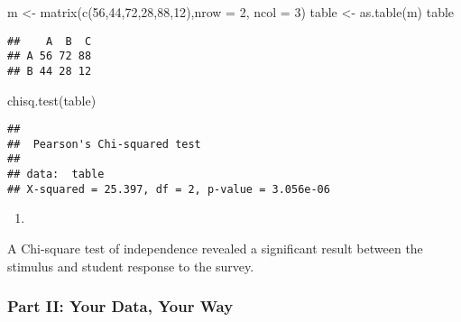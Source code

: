 \documentclass[
]{article}
\newenvironment{Shaded}{\begin{snugshade}}{\end{snugshade}}
\newcommand{\AttributeTok}[1]{\textcolor[rgb]{0.77,0.63,0.00}{#1}}
\newcommand{\DecValTok}[1]{\textcolor[rgb]{0.00,0.00,0.81}{#1}}
\newcommand{\FunctionTok}[1]{\textcolor[rgb]{0.00,0.00,0.00}{#1}}
\newcommand{\NormalTok}[1]{#1}
\newcommand{\OtherTok}[1]{\textcolor[rgb]{0.56,0.35,0.01}{#1}}
\providecommand{\tightlist}{%
  \setlength{\itemsep}{0pt}\setlength{\parskip}{0pt}}
\begin{document}
\begin{Shaded}
\begin{Highlighting}[]
\NormalTok{m }\OtherTok{\textless{}{-}} \FunctionTok{matrix}\NormalTok{(}\FunctionTok{c}\NormalTok{(}\DecValTok{56}\NormalTok{,}\DecValTok{44}\NormalTok{,}\DecValTok{72}\NormalTok{,}\DecValTok{28}\NormalTok{,}\DecValTok{88}\NormalTok{,}\DecValTok{12}\NormalTok{),}\AttributeTok{nrow =} \DecValTok{2}\NormalTok{, }\AttributeTok{ncol =} \DecValTok{3}\NormalTok{)}
\NormalTok{table }\OtherTok{\textless{}{-}} \FunctionTok{as.table}\NormalTok{(m)}
\NormalTok{table}
\end{Highlighting}
\end{Shaded}

\begin{verbatim}
##    A  B  C
## A 56 72 88
## B 44 28 12
\end{verbatim}

\begin{Shaded}
\begin{Highlighting}[]
\FunctionTok{chisq.test}\NormalTok{(table)}
\end{Highlighting}
\end{Shaded}

\begin{verbatim}
## 
##  Pearson's Chi-squared test
## 
## data:  table
## X-squared = 25.397, df = 2, p-value = 3.056e-06
\end{verbatim}

\begin{enumerate}
\def\labelenumi{\alph{enumi})}
\setcounter{enumi}{2}
\tightlist
\item
\end{enumerate}

A Chi-square test of independence revealed a significant result between
the stimulus and student response to the survey.

\hypertarget{part-ii-your-data-your-way}{%
\subsubsection{Part II: Your Data, Your
Way}\label{part-ii-your-data-your-way}}
\end{document}
